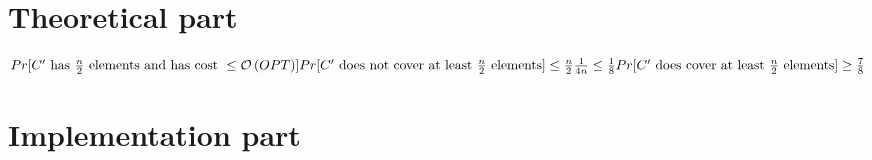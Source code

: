 \section{Theoretical part}


\begin{math}
Pr[C'\text{ has } \frac{n}{2} \text{ elements and has cost } \leq \mathcal{O}\left(OPT\right)]\\
\\
Pr[C' \text{ does not cover at least } \frac{n}{2} \text{ elements}] \leq \frac{n}{2} \frac{1}{4n} \leq \frac{1}{8}\\
\\
Pr[C' \text{ does cover at least } \frac{n}{2} \text{ elements}] \geq \frac{7}{8}
\end{math}

\section{Implementation part}
